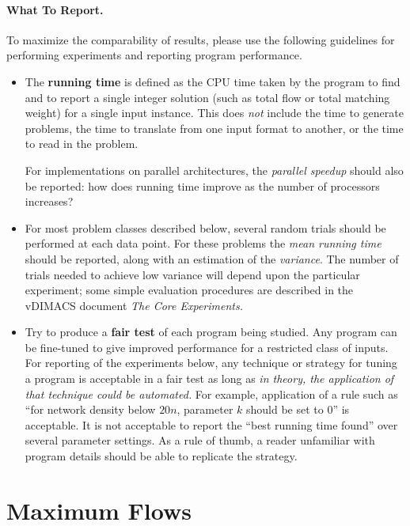 \paragraph{What To Report.} 
To maximize the comparability of results, please use the 
following guidelines for performing experiments and reporting
program performance.  
\begin{itemize}
\item  The {\bf running time} is defined as the CPU time taken by the
program to find and to report a single integer solution (such as total
flow or total matching weight) for a single input instance.  This does
{\em not} include the time to generate problems, the 
time to translate from one input format to another, or the time to 
read in the problem. 

For implementations on parallel architectures, the {\em parallel speedup} 
should also be reported:  how does running time improve as the number of 
processors increases?  

\item  For most problem classes described below, 
several random trials should be performed at each data point. 
For these problems the {\em mean running time} should be reported, along with 
an estimation of the {\em variance}.  The number of trials needed to
achieve low variance will depend upon the particular experiment; 
some simple evaluation procedures are described in the 
vDIMACS document {\em The Core Experiments.} 

\item  Try to produce a {\bf fair test} of each program being studied.  
Any program can be fine-tuned to give improved performance for a 
restricted class of inputs.  For reporting of the experiments below,
any technique or strategy for tuning a program is acceptable in a 
fair test as long as {\em in theory, the application of that technique
could be automated.}   For example, application of a 
rule such as ``for network density below $20n$,  
parameter $k$ should be set to 0'' is acceptable.   It is 
not acceptable to report the ``best running time found''  over
several parameter settings.  As
a rule of thumb, a reader unfamiliar with program details should 
be able to replicate the strategy. 
\end{itemize} 

\section{Maximum Flows}

